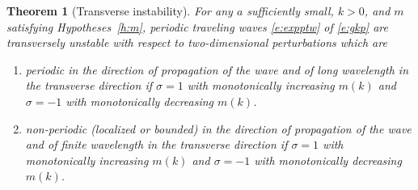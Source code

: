 \documentclass[12pt]{amsart}    %
\newtheorem{theorem}{Theorem}[section]
\numberwithin{equation}{section}
\begin{document}
\begin{theorem}[Transverse instability]\label{t:1}
For any $a$ sufficiently small, $k>0$, and $m$ satisfying Hypotheses~\ref{h:m}, periodic traveling waves \eqref{e:expptw} of \eqref{e:gkp} are transversely unstable with respect to two-dimensional perturbations which are 
\begin{enumerate}
    \item periodic in the direction of propagation of the wave and of long wavelength in the transverse direction if $\sigma=1$ with monotonically increasing $m(k)$ and $\sigma=-1$ with monotonically decreasing $m(k)$.
    \item non-periodic (localized or bounded) in the direction of propagation of the wave and of finite wavelength in the transverse direction if $\sigma=1$ with monotonically increasing $m(k)$ and $\sigma=-1$ with monotonically decreasing $m(k)$.
\end{enumerate}

\end{theorem}

\end{document}
